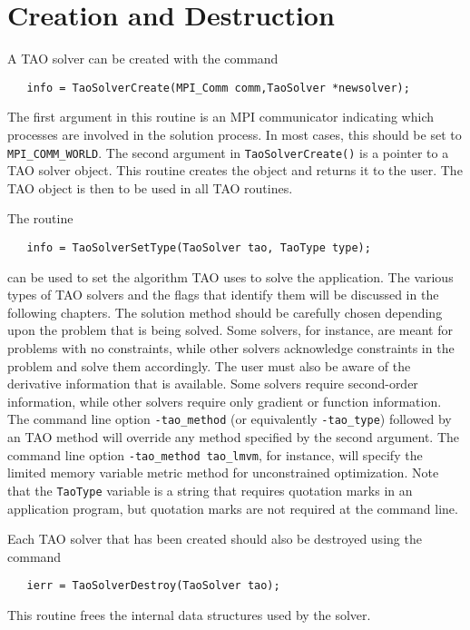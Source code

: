 \section{Creation and Destruction}

A TAO solver can be created with
the command 
\begin{verbatim}
   info = TaoSolverCreate(MPI_Comm comm,TaoSolver *newsolver);
\end{verbatim}
\noindent
The first argument in this routine is an MPI communicator indicating which
processes are involved in the solution process.  In
most cases, this should be set to {\tt MPI\_COMM\_WORLD}.
The second argument in {\tt TaoSolverCreate()} is a pointer to a TAO solver
object.  This routine creates the object and returns it to the user.
The TAO object is then to be used in all TAO routines.

The routine
\begin{verbatim}
   info = TaoSolverSetType(TaoSolver tao, TaoType type);
\end{verbatim}
\noindent
can be used to set the algorithm TAO uses to solve the application.
The various types of TAO solvers and the flags that identify them 
will be discussed in the following chapters.
The solution method should be carefully chosen depending upon
the problem that is being solved.  Some solvers, for instance, are meant for
problems with no constraints, while other solvers acknowledge constraints
in the problem and solve them accordingly.
The user must also be aware of the derivative information that is available.
Some solvers require second-order information, while other solvers require
only gradient or function information.
The command line option \texttt{-tao\_method} (or equivalently 
\texttt{-tao\_type}) followed by an TAO method
will override any method specified by the second argument.
The command line option {\tt -tao\_method tao\_lmvm}, for instance,
will specify the limited memory variable metric method for unconstrained
optimization.  Note that the {\tt TaoType} variable is a string that requires
quotation marks in an application program, but quotation marks are not required
at the command line.

Each TAO solver that has been created should also be destroyed using
the command 
\begin{verbatim}
   ierr = TaoSolverDestroy(TaoSolver tao);
\end{verbatim}
\noindent 
This routine frees the internal data structures used by the solver.


